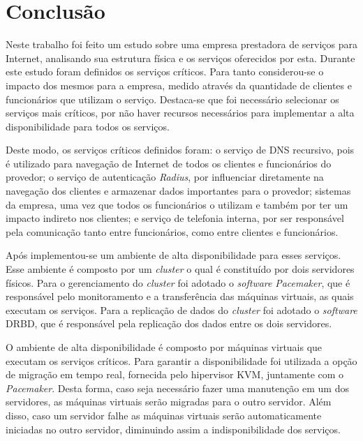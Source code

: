 \chapter{Conclusão}
\label{cap:conclusao}

Neste trabalho foi feito um estudo sobre uma empresa prestadora de serviços para Internet, analisando sua estrutura física e os serviços oferecidos 
por esta. Durante este estudo foram definidos os serviços críticos. Para tanto considerou-se o impacto dos mesmos para a empresa, medido através
da quantidade de clientes e funcionários que utilizam o serviço. Destaca-se que foi necessário selecionar os serviços mais críticos, por não 
haver recursos necessários para implementar a alta disponibilidade para todos os serviços.

Deste modo, os serviços críticos definidos foram: o serviço de \ac{DNS} recursivo, pois é utilizado para navegação de Internet de todos os clientes 
e funcionários do provedor; o serviço de autenticação \textit{Radius}, por influenciar diretamente na navegação dos clientes e armazenar dados 
importantes para o provedor; sistemas da empresa, uma vez que todos os funcionários o utilizam e também por ter um impacto indireto nos 
clientes; e serviço de telefonia interna, por ser responsável pela comunicação tanto entre funcionários, como entre clientes e funcionários.

Após implementou-se um ambiente de alta disponibilidade para esses serviços. Esse ambiente é composto por um \textit{cluster} o qual é constituído 
por dois servidores físicos. Para o gerenciamento do \textit{cluster} foi adotado o \textit{software} \textit{Pacemaker}, que é responsável pelo 
monitoramento e a transferência das máquinas virtuais, as quais executam os serviços. Para a replicação de dados 
do \textit{cluster} foi adotado o \textit{software} \ac{DRBD}, que é responsável pela replicação dos dados entre os dois servidores.

O ambiente de alta disponibilidade é composto por máquinas virtuais que executam os serviços críticos. Para garantir a disponibilidade 
foi utilizada a opção de migração em tempo real, fornecida pelo hipervisor \ac{KVM}, juntamente com o \textit{Pacemaker}. Desta forma, 
caso seja necessário fazer uma manutenção em um dos servidores, as máquinas virtuais serão migradas para o outro servidor.
Além disso, caso um servidor falhe as máquinas virtuais serão automaticamente iniciadas no outro servidor, diminuindo assim a indisponibilidade
dos serviços.

